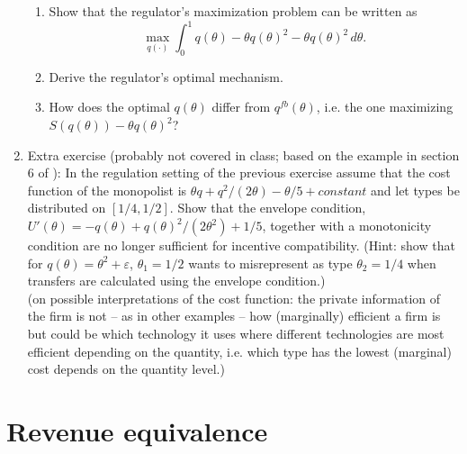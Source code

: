\documentclass[a4paper,12pt]{article}
\begin{document}
\begin{enumerate}
\begin{enumerate}
  \item Show that the regulator's maximization problem can be written as $$\max_{q(\cdot)}\int_0^1 q(\theta )-\theta q(\theta )^2-\theta q(\theta )^2\,d\theta. $$
  \item Derive the regulator's optimal mechanism.
    \item How does the optimal $q(\theta )$ differ from $q^{fb}(\theta )$, i.e. the one maximizing $S(q(\theta ))-\theta q(\theta )^2$? 
    \end{enumerate}
  \item Extra exercise (probably not covered in class; based on the example in section 6 of \cite{schottmueller2015jet}): In the regulation setting of the previous exercise assume that the cost function of the monopolist is $\theta q+q^2/(2\theta)-\theta /5+constant$ and let types be distributed on $[1/4,1/2]$. Show that the envelope condition, $U'(\theta )=-q(\theta )+q(\theta )^2/(2\theta ^2)+1/5$, together with a monotonicity condition are no longer sufficient for incentive compatibility. (Hint: show that for $q(\theta )=\theta ^2+\varepsilon $, $\theta _1=1/2$ wants to misrepresent as type $\theta _2=1/4$ when transfers are calculated using the envelope condition.)\\
    (on possible interpretations of the cost function: the private information of the firm is not -- as in other examples -- how (marginally) efficient a firm is but could be which technology it uses where different technologies are most efficient depending on the quantity, i.e. which type has the lowest (marginal) cost depends on the quantity level.)
\end{enumerate}

\section{Revenue equivalence}
\label{sec:revenue-equivalence}
\end{document}
